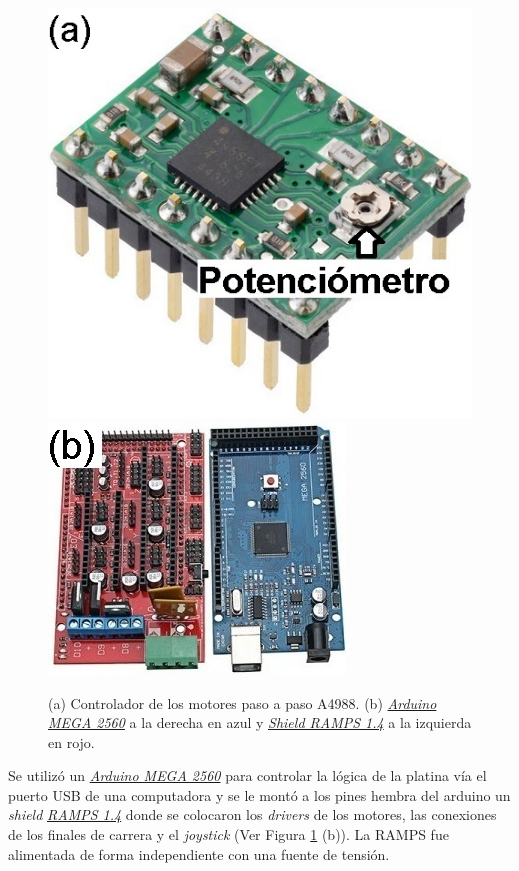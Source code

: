 \begin{figure}[H]
\hfill%
\includegraphics[scale=0.3]{Figs/microespectrometro/a4988.jpg}
\hfill%
\includegraphics[scale=0.8]{Figs/microespectrometro/megaramps.jpg}
\hfill%
\hfill%
\caption{(a) Controlador de los motores paso a paso A4988. (b) \href{https://store.arduino.cc/usa/mega-2560-r3}{\textit{Arduino MEGA 2560}} a la derecha en azul y \href{https://reprap.org/wiki/RAMPS_1.4}{\textit{Shield RAMPS 1.4}} a la izquierda en rojo.}
\label{fig:elec}
\end{figure}

Se utilizó un \href{https://store.arduino.cc/usa/mega-2560-r3}{\textit{Arduino MEGA 2560}} para controlar la lógica de la platina vía el puerto USB de una computadora y se le montó a los pines hembra del arduino un \textit{shield} \href{https://reprap.org/wiki/RAMPS_1.4}{\textit{RAMPS 1.4}} donde se colocaron los \textit{drivers} de los motores, las conexiones de los finales de carrera y el \textit{joystick} (Ver Figura \ref{fig:elec} (b)). La RAMPS fue alimentada de forma independiente con una fuente de tensión.

